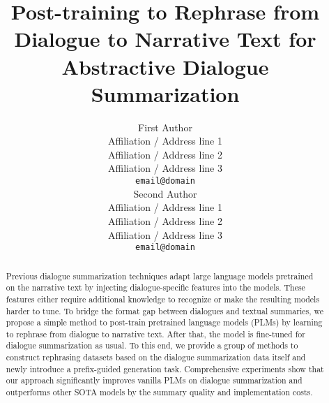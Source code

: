 \documentclass[11pt]{article}
\title{Post-training to Rephrase from Dialogue to Narrative Text for Abstractive Dialogue Summarization}
\author{First Author \\
  Affiliation / Address line 1 \\
  Affiliation / Address line 2 \\
  Affiliation / Address line 3 \\
  \texttt{email@domain} \\\And
  Second Author \\
  Affiliation / Address line 1 \\
  Affiliation / Address line 2 \\
  Affiliation / Address line 3 \\
  \texttt{email@domain} \\}
\begin{document}
\maketitle
\begin{abstract}
Previous dialogue summarization techniques adapt large language models pretrained on the narrative text by injecting dialogue-specific features into the models. These features either require additional knowledge to recognize or make the resulting models harder to tune. To bridge the format gap between dialogues and textual summaries, we propose a simple method to post-train pretrained language models (PLMs) by learning to rephrase from dialogue to narrative text. %
After that, the model is fine-tuned for dialogue summarization as usual. To this end, we provide a group of methods to construct rephrasing datasets based on the dialogue summarization data itself and newly introduce a prefix-guided generation task. Comprehensive experiments show that our approach significantly 
improves vanilla PLMs on dialogue summarization and 
outperforms other SOTA models by the summary quality and implementation costs.

\end{abstract}











\newpage
\appendix

\end{document}

